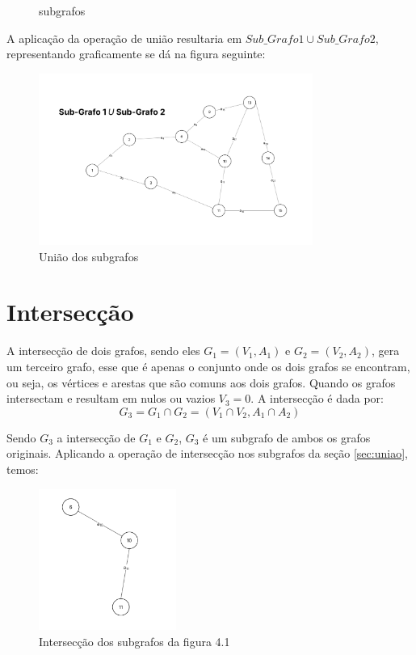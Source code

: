 \begin{figure}[!htb]
	\caption{subgrafos}
	\label{fig:duasFiguras}
\end{figure}

A aplicação da operação de união resultaria em $Sub\_Grafo1 \cup Sub\_Grafo2$, representando graficamente se dá na figura seguinte:

\begin{figure}
	\centering
	\includegraphics[width=0.8\textwidth]{figuras/subgrafos/subgrafo1usubgrafo2.png}
	\caption{União dos subgrafos}
	\label{fig:uniaoGrafos}
\end{figure}

\section{Intersecção}\label{sec:interseccao}
A intersecção de dois grafos, sendo eles $G_1 = (V_1, A_1)$ e $G_2 = (V_2, A_2)$, gera um terceiro grafo, esse que é apenas o conjunto onde os dois grafos se encontram, ou seja, os vértices e arestas que são comuns aos dois grafos. Quando os grafos intersectam e resultam em nulos ou vazios $V_3 = 0$. A intersecção é dada por:
\[
	G_3 = G_1 \cap G_2 = (V_1 \cap V_2, A_1 \cap A_2)
\]

Sendo $G_3$ a intersecção de $G_1$ e $G_2$, $G_3$ é um subgrafo de ambos os grafos originais.
Aplicando a operação de intersecção nos subgrafos da seção \ref{sec:uniao}, temos:

\begin{figure}[!h]
	\centering
	\includegraphics[width=0.4\textwidth]{figuras/subgrafos/subgrafo_inter.png}
	\caption{Intersecção dos subgrafos da figura 4.1}
	\label{fig:intersecaoGrafos}
\end{figure}

